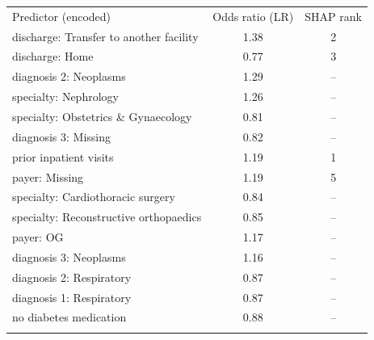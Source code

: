 \begin{tabular}{lcc}
\hline\noalign{\smallskip}
Predictor (encoded) & Odds ratio (LR) & SHAP rank \\
\noalign{\smallskip}\hline\noalign{\smallskip}
discharge: Transfer to another facility & 1.38 & 2 \\
discharge: Home & 0.77 & 3 \\
diagnosis 2: Neoplasms & 1.29 & -- \\
specialty: Nephrology & 1.26 & -- \\
specialty: Obstetrics \& Gynaecology & 0.81 & -- \\
diagnosis 3: Missing & 0.82 & -- \\
prior inpatient visits & 1.19 & 1 \\
payer: Missing & 1.19 & 5 \\
specialty: Cardiothoracic surgery & 0.84 & -- \\
specialty: Reconstructive orthopaedics & 0.85 & -- \\
payer: OG & 1.17 & -- \\
diagnosis 3: Neoplasms & 1.16 & -- \\
diagnosis 2: Respiratory & 0.87 & -- \\
diagnosis 1: Respiratory & 0.87 & -- \\
no diabetes medication & 0.88 & -- \\
\noalign{\smallskip}\hline
\end{tabular}
